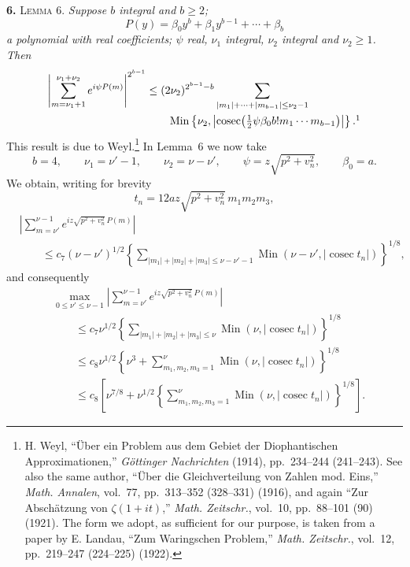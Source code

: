 \documentclass[11pt]{article}
\newcommand{\cosec}{\operatorname{cosec}}
\newcommand{\Min}{\operatorname{Min}}
\begin{document}
\medskip
\noindent\textbf{6.} \textsc{Lemma 6.}
\textit{Suppose $b$ integral and $b\geq2$;
\[
 P(y)=\beta_0y^b+\beta_1y^{b-1}+\cdots+\beta_b
\]
a polynomial with real coefficients; $\psi$ real, $\nu_1$ integral,
$\nu_2$ integral and $\nu_2\geq1$. Then}
\begin{align*}
 \left|\sum_{m=\nu_1+1}^{\nu_1+\nu_2}e^{i\psi P(m)}\right|^{2^{b-1}}
 &\leq(2\nu_2)^{2^{b-1}-b}
 \sum_{|m_1|+\cdots+|m_{b-1}|\leq\nu_2-1} \\
 &\qquad\Min\left\{\nu_2,
 \left|\cosec\!\left(\tfrac12\psi\beta_0b!m_1\cdots m_{b-1}\right)\right|
 \right\}.\footnotemark
\end{align*}
This result is due to Weyl.\footnote{H. Weyl, ``Über ein Problem aus dem
Gebiet der Diophantischen Approximationen,'' \textit{Göttinger Nachrichten}
(1914), pp.~234--244 (241--243). See also the same author, ``Über die
Gleichverteilung von Zahlen mod. Eins,'' \textit{Math. Annalen}, vol.~77,
pp.~313--352 (328--331) (1916), and again ``Zur Abschätzung von
$\zeta(1+it)$,'' \textit{Math. Zeitschr.}, vol.~10, pp.~88--101 (90) (1921).
The form we adopt, as sufficient for our purpose, is taken from a paper by
E. Landau, ``Zum Waringschen Problem,'' \textit{Math. Zeitschr.}, vol.~12,
pp.~219--247 (224--225) (1922).}
In Lemma~6 we now take
\[
 b=4,\qquad \nu_1=\nu'-1,\qquad \nu_2=\nu-\nu',\qquad
 \psi=z\sqrt{p^2+v_n^2},\qquad \beta_0=a.
\]
We obtain, writing for brevity
\begin{equation}
 t_n=12az\sqrt{p^2+v_n^2}\,m_1m_2m_3,
 \tag{6.1}
\end{equation}
\begin{align*}
&\left|\sum_{m=\nu'}^{\nu-1}e^{iz\sqrt{p^2+v_n^2}\,P(m)}\right| \\
&\qquad\leq c_7(\nu-\nu')^{1/2}
 \left\{\sum_{|m_1|+|m_2|+|m_3|\leq\nu-\nu'-1}
 \Min\left(\nu-\nu',|\cosec t_n|\right)\right\}^{1/8},
\end{align*}
and consequently
\begin{align*}
&\max_{0\leq\nu'\leq\nu-1}
 \left|\sum_{m=\nu'}^{\nu-1}e^{iz\sqrt{p^2+v_n^2}\,P(m)}\right| \\
&\qquad\leq c_7\nu^{1/2}
 \left\{\sum_{|m_1|+|m_2|+|m_3|\leq\nu}
 \Min\left(\nu,|\cosec t_n|\right)\right\}^{1/8} \\
&\qquad\leq c_8\nu^{1/2}
 \left\{\nu^3+\sum_{m_1,m_2,m_3=1}^{\nu}
 \Min\left(\nu,|\cosec t_n|\right)\right\}^{1/8} \\
&\qquad\leq c_8\left[\nu^{7/8}+\nu^{1/2}
 \left\{\sum_{m_1,m_2,m_3=1}^{\nu}
 \Min\left(\nu,|\cosec t_n|\right)\right\}^{1/8}\right].
\end{align*}
\end{document}
